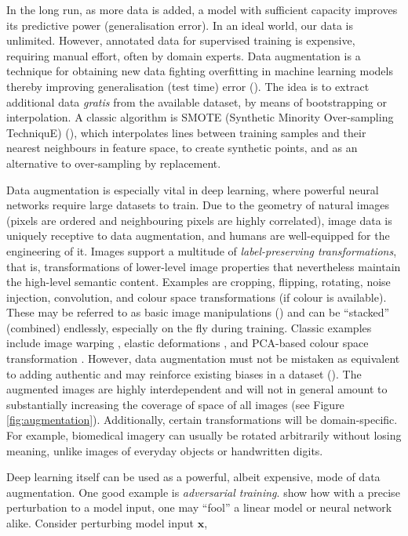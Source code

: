 In the long run, as more data is added, a model with sufficient capacity improves its predictive power (generalisation error). In an ideal world, our data is unlimited. However, annotated data for supervised training is expensive, requiring manual effort, often by domain experts. Data augmentation is a technique for obtaining new data fighting overfitting in machine learning models thereby improving generalisation (test time) error (\cite{shorten2019survey}). The idea is to extract additional data \emph{gratis} from the available dataset, by means of bootstrapping or interpolation. A classic algorithm is SMOTE (Synthetic Minority Over-sampling TechniquE) (\cite{chawla2002smote}), which interpolates lines between training samples and their nearest neighbours in feature space, to create synthetic points, and as an alternative to over-sampling by replacement.

Data augmentation is especially vital in deep learning, where powerful neural networks require large datasets to train. Due to the geometry of natural images (pixels are ordered and neighbouring pixels are highly correlated), image data is uniquely receptive to data augmentation, and humans are well-equipped for the engineering of it. Images support a multitude of \emph{label-preserving transformations}, that is, transformations of lower-level image properties that nevertheless maintain the high-level semantic content. Examples are cropping, flipping, rotating, noise injection, convolution, and colour space transformations (if colour is available). These may be referred to as basic image manipulations (\cite{shorten2019survey}) and can be ``stacked'' (combined) endlessly, especially on the fly during training. Classic examples include image warping \cite{lecun1998gradient}, elastic deformations \cite{simard2003best}, and PCA-based colour space transformation \cite{krizhevsky2012imagenet}. However, data augmentation must not be mistaken as equivalent to adding authentic and may reinforce existing biases in a dataset (\cite{shorten2019survey}). The augmented images are highly interdependent and will not in general amount to substantially increasing the coverage of space of all images (see Figure \ref{fig:augmentation}). Additionally, certain transformations will be domain-specific. For example, biomedical imagery can usually be rotated arbitrarily without losing meaning, unlike images of everyday objects or handwritten digits.

Deep learning itself can be used as a powerful, albeit expensive, mode of data augmentation. One good example is \emph{adversarial training}. \cite{goodfellow2014explaining} show how with a precise perturbation to a model input, one may ``fool'' a linear model or neural network alike. Consider perturbing model input $\mathbf{x}$,


